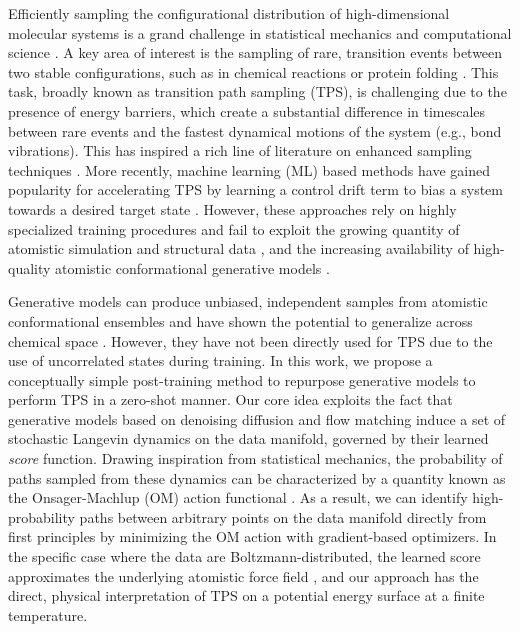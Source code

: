 Efficiently sampling the configurational distribution of high-dimensional molecular systems is a grand challenge in statistical mechanics and computational science \cite{tuckerman2023statistical, frenkel2023understanding}. A key area of interest is the sampling of rare, transition events between two stable configurations, such as in chemical reactions or protein folding \cite{bolhuis2002transition, dellago2002transition}. This task, broadly known as transition path sampling (TPS), is challenging due to the presence of energy barriers, which create a substantial difference in timescales between rare events and the fastest dynamical motions of the system (e.g., bond vibrations). This has inspired a rich line of literature on enhanced sampling techniques \cite{torrie1977nonphysical, swendsen1986replica, laio2002escaping, laio2008metadynamics, tiwary2013metadynamics, valsson2014variational}. More recently, machine learning (ML) based methods have gained popularity for accelerating TPS by learning a control drift term to bias a system towards a desired target state \cite{sipka2023differentiable, holdijk2024stochastic, du2024doob, seong2024transitionpathsamplingimproved}. However, these approaches rely on highly specialized training procedures and fail to exploit the growing quantity of atomistic simulation and structural data \cite{bank1971protein, vander2024atlas, lewis2024scalable}, and the increasing availability of high-quality atomistic conformational generative models \cite{abramson2024accurate, lewis2024scalable, jing2024alphafoldmeetsflowmatching, zheng2024predicting}. 

Generative models can produce unbiased, independent samples from atomistic conformational ensembles \cite{noe2019boltzmann, zheng2024predicting, jing2024alphafoldmeetsflowmatching} and have shown the potential to generalize across chemical space \cite{klein2024transferable, lewis2024scalable}. However, they have not been directly used for TPS due to the use of uncorrelated states during training. In this work, we propose a conceptually simple post-training method to repurpose generative models to perform TPS in a zero-shot manner. Our core idea exploits the fact that generative models based on denoising diffusion \cite{ho2020denoising} and flow matching \cite {lipman2022flow} induce a set of stochastic Langevin dynamics on the data manifold, governed by their learned \textit{score} function. Drawing inspiration from statistical mechanics, the probability of paths sampled from these dynamics can be characterized by a quantity known as the Onsager-Machlup (OM) action functional \cite{OMIbasic}. As a result, we can identify high-probability paths between arbitrary points on the data manifold directly from first principles by minimizing the OM action with gradient-based optimizers. In the specific case where the data are Boltzmann-distributed, the learned score approximates the underlying atomistic force field \cite{arts2023two}, and our approach has the direct, physical interpretation of TPS on a potential energy surface at a finite temperature.

